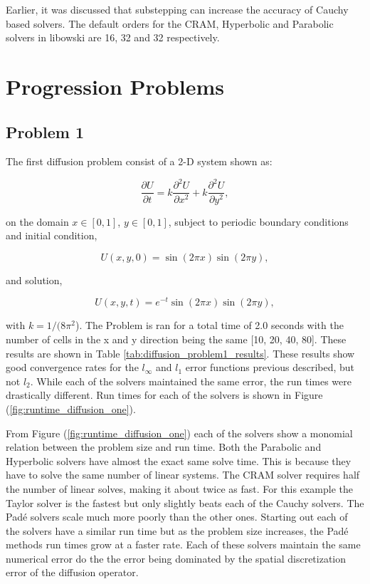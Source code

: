 Earlier, it was discussed that substepping can increase the accuracy of Cauchy based solvers. The default orders for the CRAM, Hyperbolic and Parabolic solvers in libowski are 16, 32 and 32 respectively. 

\section{Progression Problems}
\subsection{Problem 1}
The first diffusion problem consist of a 2-D system shown as:

\begin{equation}
    \frac{\partial U}{\partial t} = k\frac{\partial^{2}U}{\partial x^{2}} + k\frac{\partial^{2}U}{\partial y^{2}},
\end{equation}

\noindent on the domain $x \in [0,1]$, $y \in [0,1]$, subject to periodic boundary conditions and initial condition,


\begin{equation}
    U(x,y,0) = \sin(2\pi x)\sin(2\pi y),
\end{equation}

\noindent and solution,

\begin{equation}
    U(x,y,t) = e^{-t}\sin(2\pi x)\sin(2\pi y),
\end{equation}

\noindent with $k = 1/(8\pi^{2}$). The Problem is ran for a total time of 2.0 seconds with the number of cells in the x and y direction being the same [10, 20, 40, 80]. These results are shown in Table \ref{tab:diffusion_problem1_results}. These results show good convergence rates for the $l_{\infty}$ and $l_{1}$ error functions previous described, but not $l_{2}$. While each of the solvers maintained the same error, the run times were drastically different. Run times for each of the solvers is shown in Figure (\ref{fig:runtime_diffusion_one}).

From Figure (\ref{fig:runtime_diffusion_one}) each of the solvers show a monomial relation between the problem size and run time. Both the Parabolic and Hyperbolic solvers have almost the exact same solve time. This is because they have to solve the same number of linear systems. The CRAM solver requires half the number of linear solves, making it about twice as fast. For this example the Taylor solver is the fastest but only slightly beats each of the Cauchy solvers. The Pad\'e solvers scale much more poorly than the other ones. Starting out each of the solvers have a similar run time but as the problem size increases, the Pad\'e methods run times grow at a faster rate. Each of these solvers maintain the same numerical error do the the error being dominated by the spatial discretization error of the diffusion operator. 

